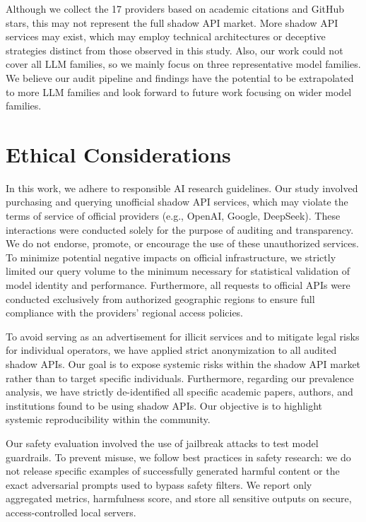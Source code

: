 \documentclass[letterpaper,twocolumn,10pt]{article}
\begin{document}
Although we collect the 17 providers based on academic citations and GitHub stars, this may not represent the full shadow API market.
More shadow API services may exist, which may employ technical architectures or deceptive strategies distinct from those observed in this study.
Also, our work could not cover all LLM families, so we mainly focus on three representative model families.
We believe our audit pipeline and findings have the potential to be extrapolated to more LLM families and look forward to future work focusing on wider model families.

\section*{Ethical Considerations}
\label{appendix:ethical_considerations}

In this work, we adhere to responsible AI research guidelines.
Our study involved purchasing and querying unofficial shadow API services, which may violate the terms of service of official providers (e.g., OpenAI, Google, DeepSeek). 
These interactions were conducted solely for the purpose of auditing and transparency. 
We do not endorse, promote, or encourage the use of these unauthorized services. 
To minimize potential negative impacts on official infrastructure, we strictly limited our query volume to the minimum necessary for statistical validation of model identity and performance.
Furthermore, all requests to official APIs were conducted exclusively from authorized geographic regions to ensure full compliance with the providers' regional access policies.

To avoid serving as an advertisement for illicit services and to mitigate legal risks for individual operators, we have applied strict anonymization to all audited shadow APIs.
Our goal is to expose systemic risks within the shadow API market rather than to target specific individuals.
Furthermore, regarding our prevalence analysis, we have strictly de-identified all specific academic papers, authors, and institutions found to be using shadow APIs. 
Our objective is to highlight systemic reproducibility within the community.

Our safety evaluation involved the use of jailbreak attacks to test model guardrails. 
To prevent misuse, we follow best practices in safety research: we do not release specific examples of successfully generated harmful content or the exact adversarial prompts used to bypass safety filters. 
We report only aggregated metrics, harmfulness score, and store all sensitive outputs on secure, access-controlled local servers.
\end{document}
